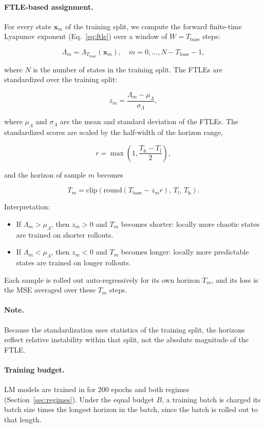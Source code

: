 \documentclass{article}
\begin{document}
\paragraph{FTLE-based assignment.}
For every state $\mathbf{x}_m$ of the training split, we compute the forward finite-time Lyapunov exponent (Eq.~\eqref{eq:ftle}) over a window of $W = T_{\mathrm{base}}$ steps:

\[
\Lambda_m = \Lambda_{T_{\mathrm{base}}}(\mathbf{x}_m), \quad m = 0, \dots, N - T_{\mathrm{base}} - 1,
\]

where $N$ is the number of states in the training split. The FTLEs are standardized over the training split:

\[
z_m = \frac{\Lambda_m - \mu_{\Lambda}}{\sigma_{\Lambda}},
\]

where $\mu_{\Lambda}$ and $\sigma_{\Lambda}$ are the mean and standard deviation of the FTLEs. The standardized scores are scaled by the half-width of the horizon range,

\[
r = \max\left( 1, \frac{T_{\mathrm{h}} - T_{\mathrm{l}}}{2} \right),
\]

and the horizon of sample $m$ becomes

\[
T_m = \mathrm{clip}\left( \mathrm{round}(T_{\mathrm{base}} - z_m r),\, T_{\mathrm{l}},\, T_{\mathrm{h}} \right).
\]

Interpretation:
\begin{itemize}
    \item If $\Lambda_m > \mu_{\Lambda}$, then $z_m > 0$ and $T_m$ becomes shorter: locally more chaotic states are trained on shorter rollouts.
    \item If $\Lambda_m < \mu_{\Lambda}$, then $z_m < 0$ and $T_m$ becomes longer: locally more predictable states are trained on longer rollouts.
\end{itemize}

Each sample is rolled out auto-regressively for its own horizon $T_m$, and its loss is the MSE averaged over these $T_m$ steps.

\paragraph{Note.}
Because the standardization uses statistics of the training split, the horizons reflect relative instability within that split, not the absolute magnitude of the FTLE.

\paragraph{Training budget.}
LM models are trained in for 200 epochs and both regimes (Section~\ref{sec:regimes}). Under the equal budget $B$, a training batch is charged its batch size times the longest horizon in the batch, since the batch is rolled out to that length.
\end{document}
